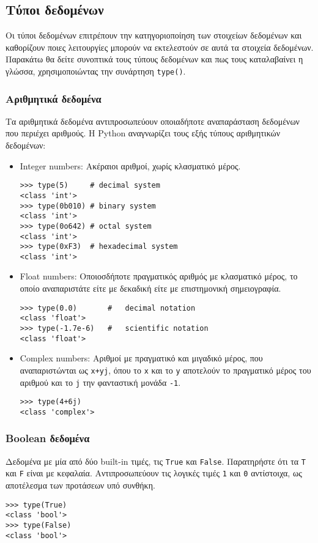 \documentclass[12pt]{extreport}
\begin{document}
\subsection{Τύποι δεδομένων}

Οι τύποι δεδομένων επιτρέπουν την κατηγοριοποίηση των στοιχείων δεδομένων και καθορίζουν ποιες λειτουργίες μπορούν να εκτελεστούν σε αυτά τα στοιχεία δεδομένων. Παρακάτω θα δείτε συνοπτικά τους τύπους δεδομένων και πως τους καταλαβαίνει η γλώσσα, χρησιμοποιώντας την συνάρτηση \lstinline{type()}.

\subsubsection{Αριθμητικά δεδομένα}

Τα αριθμητικά δεδομένα αντιπροσωπεύουν οποιαδήποτε αναπαράσταση δεδομένων που περιέχει αριθμούς. Η Python αναγνωρίζει τους εξής τύπους αριθμητικών δεδομένων:

\begin{itemize}
    \item Integer numbers: Ακέραιοι αριθμοί, χωρίς κλασματικό μέρος.
          \begin{lstlisting}[numbers=none]
>>> type(5)     # decimal system
<class 'int'>
>>> type(0b010) # binary system
<class 'int'>
>>> type(0o642) # octal system
<class 'int'>
>>> type(0xF3)  # hexadecimal system
<class 'int'>
\end{lstlisting}
    \item Float numbers: Οποιοσδήποτε πραγματικός αριθμός με κλασματικό μέρος, το οποίο αναπαριστάτε είτε με δεκαδική είτε με επιστημονική σημειογραφία.
          \begin{lstlisting}[numbers=none]
>>> type(0.0)       #   decimal notation
<class 'float'>
>>> type(-1.7e-6)   #   scientific notation
<class 'float'>
\end{lstlisting}
    \item Complex numbers: Αριθμοί με πραγματικό και μιγαδικό μέρος, που αναπαριστώνται ως \lstinline{x+yj}, όπου το \lstinline{x} και το \lstinline{y} αποτελούν το πραγματικό μέρος του αριθμού και το \lstinline{j} την φανταστική μονάδα \lstinline{-1}.
          \begin{lstlisting}[numbers=none]
>>> type(4+6j)
<class 'complex'>
\end{lstlisting}
\end{itemize}

\subsubsection{Boolean δεδομένα}
Δεδομένα με μία από δύο built-in τιμές, τις \lstinline{True} και \lstinline{False}. Παρατηρήστε ότι τα \lstinline{T} και \lstinline{F} είναι με κεφαλαία. Αντιπροσωπεύουν τις λογικές τιμές \lstinline{1} και \lstinline{0} αντίστοιχα, ως αποτέλεσμα των προτάσεων υπό συνθήκη.
\begin{lstlisting}[numbers=none]
>>> type(True)
<class 'bool'>
>>> type(False)
<class 'bool'>        
\end{lstlisting}
\end{document}

